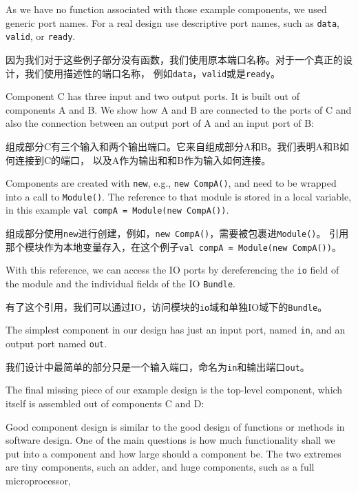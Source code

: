 \documentclass[%
    10pt,
    headinclude, footexclude,
    openright, %
    notitlepage,
    cleardoubleempty,
    headsepline,
    pointlessnumbers,
    bibtotoc, idxtotoc,
    ]{scrbook}
\newcommand{\code}[1]{{\small{\texttt{#1}}}}
\begin{document}
As we have no function associated with those example components,
we used generic port names. For a real design use descriptive
port names, such as \code{data}, \code{valid}, or \code{ready}.

因为我们对于这些例子部分没有函数，我们使用原本端口名称。对于一个真正的设计，我们使用描述性的端口名称，
例如\code{data}，\code{valid}或是\code{ready}。

Component C has three input and two output ports. It is built out of
components A and B. We show how A and B are connected to the ports
of C and also the connection between an output port of A and an
input port of B:

组成部分C有三个输入和两个输出端口。它来自组成部分A和B。我们表明A和B如何连接到C的端口，
以及A作为输出和和B作为输入如何连接。


Components are created with \code{new}, e.g., \code{new CompA()}, and need to be wrapped
into a call to \code{Module()}. The reference to that module is stored in a local variable,
in this example \code{val compA = Module(new CompA())}.

组成部分使用\code{new}进行创建，例如，\code{new CompA()}，需要被包裹进\code{Module()}。
引用那个模块作为本地变量存入，在这个例子\code{val compA = Module(new CompA())}。

With this reference, we can access the IO ports by dereferencing the \code{io} field of the module
and the individual fields of the IO \code{Bundle}.

有了这个引用，我们可以通过IO，访问模块的\code{io}域和单独IO域下的\code{Bundle}。

The simplest component in our design has just an input port, named \code{in}, and
an output port named \code{out}.

我们设计中最简单的部分只是一个输入端口，命名为\code{in}和输出端口\code{out}。


The final missing piece of our example design is the top-level component, which itself
is assembled out of components C and D:


Good component design is similar to the good design of functions or methods in
software design. One of the main questions is how much functionality shall we put into
a component and how large should a component be. The two extremes are tiny
components, such an adder, and huge components, such as a full microprocessor,
\end{document}
